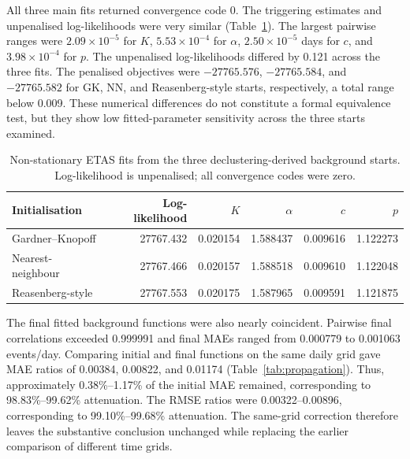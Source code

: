 All three main fits returned convergence code 0. The triggering estimates and
unpenalised log-likelihoods were very similar
(Table~\ref{tab:etas_parameters}). The largest pairwise ranges were
$2.09\times10^{-5}$ for $K$, $5.53\times10^{-4}$ for $\alpha$,
$2.50\times10^{-5}$ days for $c$, and $3.98\times10^{-4}$ for $p$. The
unpenalised log-likelihoods differed by 0.121 across the three fits. The
penalised objectives were $-27765.576$, $-27765.584$, and $-27765.582$ for
GK, NN, and Reasenberg-style starts, respectively, a total range below 0.009.
These numerical differences do not constitute a formal equivalence test, but
they show low fitted-parameter sensitivity across the three starts examined.

\begin{table}[htbp]
\centering
\caption{Non-stationary ETAS fits from the three declustering-derived
background starts. Log-likelihood is unpenalised; all convergence codes were
zero.}
\label{tab:etas_parameters}
\begin{tabular}{lrrrrr}
\toprule
Initialisation & Log-likelihood & $K$ & $\alpha$ & $c$ & $p$ \\
\midrule
Gardner--Knopoff & 27767.432 & 0.020154 & 1.588437 & 0.009616 & 1.122273 \\
Nearest-neighbour & 27767.466 & 0.020157 & 1.588518 & 0.009610 & 1.122048 \\
Reasenberg-style & 27767.553 & 0.020175 & 1.587965 & 0.009591 & 1.121875 \\
\bottomrule
\end{tabular}
\end{table}

The final fitted background functions were also nearly coincident. Pairwise
final correlations exceeded 0.999991 and final MAEs ranged from 0.000779 to
0.001063 events/day. Comparing initial and final functions on the same daily
grid gave MAE ratios of 0.00384, 0.00822, and 0.01174
(Table~\ref{tab:propagation}). Thus, approximately 0.38\%--1.17\% of the
initial MAE remained, corresponding to 98.83\%--99.62\% attenuation. The
RMSE ratios were 0.00322--0.00896, corresponding to 99.10\%--99.68\%
attenuation. The same-grid correction therefore leaves the substantive
conclusion unchanged while replacing the earlier comparison of different
time grids.

